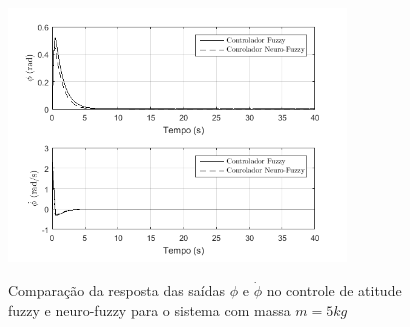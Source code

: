 %
\begin{figure}[!htb]
    \centering
    \caption{Comparação da resposta das saídas $\phi$ e $\dot{\phi}$ no controle de atitude fuzzy e neuro-fuzzy para o sistema com massa $m=5kg$}
    \includegraphics[width=0.8\textwidth]{./04-figuras/resultados/novos/atitude_phi_phidot_5kg_40s}
    \label{fig:atitude_phi_phidot_5kg_40s}
\end{figure}

